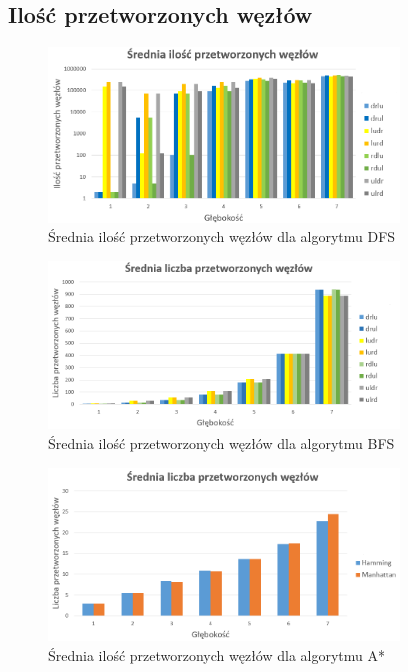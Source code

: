 \documentclass{classrep}
\begin{document}
\newpage
\subsection{Ilość przetworzonych węzłów}
\begin{figure}[h!]
    \centering
    \includegraphics[width=0.83\textwidth]{processedDFS.png}
    \caption{Średnia ilość przetworzonych węzłów dla algorytmu DFS}
	\label{processedDFS}
\end{figure}
\begin{figure}[h!]
    \centering
    \includegraphics[width=0.83\textwidth]{processedBFS.png}
    \caption{Średnia ilość przetworzonych węzłów dla algorytmu BFS}
	\label{processedBFS}
\end{figure}
\begin{figure}[h!]
    \centering
    \includegraphics[width=0.83\textwidth]{processedastar.png}
    \caption{Średnia ilość przetworzonych węzłów dla algorytmu A*}
	\label{processedASTR}
\end{figure}
\end{document}
